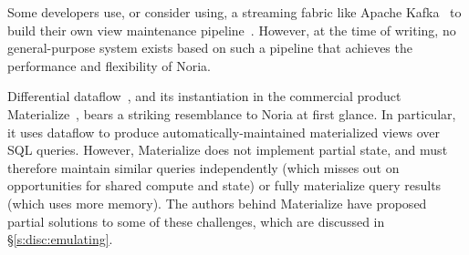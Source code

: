 Some developers use, or consider using, a streaming fabric like Apache
Kafka~\cite{kafka} to build their own view maintenance pipeline~\cite{nyt-kafka,
samza-blogpost}. However, at the time of writing, no general-purpose system
exists based on such a pipeline that achieves the performance and flexibility of
Noria.

Differential dataflow~\cite{differential-dataflow}, and its instantiation in the
commercial product Materialize~\cite{materialize}, bears a striking resemblance
to Noria at first glance. In particular, it uses dataflow to produce
automatically-maintained materialized views over SQL queries. However,
Materialize does not implement partial state, and must therefore maintain
similar queries independently (which misses out on opportunities for shared
compute and state) or fully materialize query results (which uses more memory).
The authors behind Materialize have proposed partial solutions to some of these
challenges, which are discussed in \S\ref{s:disc:emulating}.

